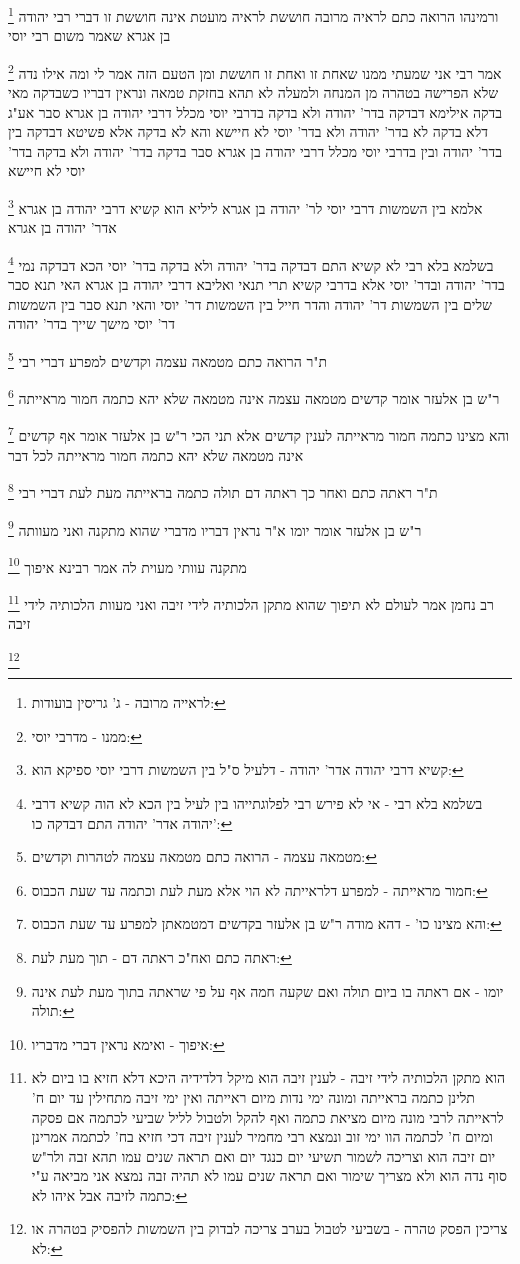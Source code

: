 \documentclass[12pt, openany]{book}
\newcommand{\footnotecomment}[1]{
	\renewcommand\thefootnote{}
	\footnote{#1}}
\newcommand{\commenta}[1]{\footnotecomment{#1}}
\begin{document}
{{\commenta{לראייה מרובה - ג' גריסין בועודות:}
ורמינהו הרואה כתם לראיה מרובה חוששת לראיה מועטת אינה חוששת זו דברי רבי יהודה בן אגרא שאמר משום רבי יוסי 
\commenta{ממנו - מדרבי יוסי:}
אמר רבי אני שמעתי ממנו שאחת זו ואחת זו חוששת ומן הטעם הזה אמר לי ומה אילו נדה שלא הפרישה בטהרה מן המנחה ולמעלה לא תהא בחזקת טמאה ונראין דבריו כשבדקה 
מאי בדקה אילימא דבדקה בדר' יהודה ולא בדקה בדרבי יוסי מכלל דרבי יהודה בן אגרא סבר אע"ג דלא בדקה לא בדר' יהודה ולא בדר' יוסי לא חיישא והא לא בדקה 
אלא פשיטא דבדקה בין בדר' יהודה ובין בדרבי יוסי מכלל דרבי יהודה בן אגרא סבר בדקה בדר' יהודה ולא בדקה בדר' יוסי לא חיישא
\commenta{קשיא דרבי יהודה אדר' יהודה - דלעיל ס"ל בין השמשות דרבי יוסי ספיקא הוא:}
אלמא בין השמשות דרבי יוסי לר' יהודה בן אגרא ליליא הוא קשיא דרבי יהודה בן אגרא אדר' יהודה בן אגרא 
\commenta{בשלמא בלא רבי - אי לא פירש רבי לפלוגתייהו בין לעיל בין הכא לא הוה קשיא דרבי יהודה אדר' יהודה התם דבדקה כו':}
בשלמא בלא רבי לא קשיא התם דבדקה בדר' יהודה ולא בדקה בדר' יוסי הכא דבדקה נמי בדר' יהודה ובדר' יוסי אלא בדרבי קשיא 
תרי תנאי ואליבא דרבי יהודה בן אגרא האי תנא סבר שלים בין השמשות דר' יהודה
והדר חייל בין השמשות דר' יוסי והאי תנא סבר בין השמשות דר' יוסי מישך שייך בדר' יהודה 
\commenta{מטמאה עצמה - הרואה כתם מטמאה עצמה לטהרות וקדשים:}
ת"ר הרואה כתם מטמאה עצמה וקדשים למפרע דברי רבי 
\commenta{חמור מראייתה - למפרע דלראייתה לא הוי אלא מעת לעת וכתמה עד שעת הכבוס:}
ר"ש בן אלעזר אומר קדשים מטמאה עצמה אינה מטמאה שלא יהא כתמה חמור מראייתה 
\commenta{והא מצינו כו' - דהא מודה ר"ש בן אלעזר בקדשים דמטמאתן למפרע עד שעת הכבוס:}
והא מצינו כתמה חמור מראייתה לענין קדשים 
אלא תני הכי ר"ש בן אלעזר אומר אף קדשים אינה מטמאה שלא יהא כתמה חמור מראייתה לכל דבר 
\commenta{ראתה כתם ואח"כ ראתה דם - תוך מעת לעת:}
ת"ר ראתה כתם ואחר כך ראתה דם תולה כתמה בראייתה מעת לעת דברי רבי 
\commenta{יומו - אם ראתה בו ביום תולה ואם שקעה חמה אף על פי שראתה בתוך מעת לעת אינה תולה:}
ר"ש בן אלעזר אומר יומו א"ר נראין דבריו מדברי שהוא מתקנה ואני מעוותה 
\commenta{איפוך - ואימא נראין דברי מדבריו:}
מתקנה עוותי מעוית לה אמר רבינא איפוך 
\commenta{הוא מתקן הלכותיה לידי זיבה - לענין זיבה הוא מיקל דלדידיה היכא דלא חזיא בו ביום לא תלינן כתמה בראייתה ומונה ימי נדות מיום ראייתה ואין ימי זיבה מתחילין עד יום ח' לראייתה לרבי מונה מיום מציאת כתמה ואף להקל ולטבול לליל שביעי לכתמה אם פסקה ומיום ח' לכתמה הוו ימי זוב ונמצא רבי מחמיר לענין זיבה דכי חזיא בח' לכתמה אמרינן יום זיבה הוא וצריכה לשמור תשיעי יום כנגד יום ואם תראה שנים עמו תהא זבה ולר"ש סוף נדה הוא ולא מצריך שימור ואם תראה שנים עמו לא תהיה זבה נמצא אני מביאה ע"י כתמה לזיבה אבל איהו לא:}
רב נחמן אמר לעולם לא תיפוך שהוא מתקן הלכותיה לידי זיבה
ואני מעוות הלכותיה לידי זיבה 
\commenta{צריכין הפסק טהרה - בשביעי לטבול בערב צריכה לבדוק בין השמשות להפסיק בטהרה או לא:}
}}
\end{document}
